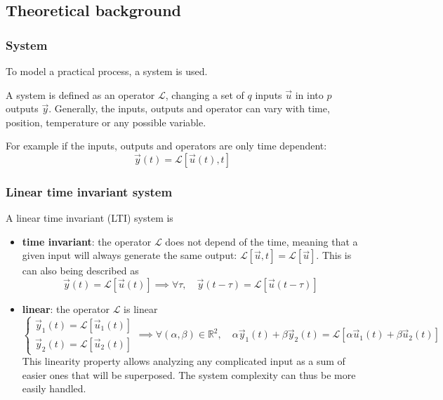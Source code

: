 \subsection{Theoretical background}
\subsubsection{System}
To model a practical process, a system is used. 

A system is defined as an operator $\mathcal{L}$, changing a set of $q$ inputs $\vec{u}$ in into $p$ outputs $\vec{y}$. Generally, the inputs, outputs and operator can vary with time, position, temperature or any possible variable.

For example if the inputs, outputs and operators are only time dependent:
\begin{equation}
	\vec{y}(t) = \mathcal{L}[\vec{u}(t),t]
\end{equation}

\subsubsection{Linear time invariant system}
A linear time invariant (LTI) system is 
\begin{itemize}
	\item \textbf{time invariant}: the operator $\mathcal{L}$ does not depend of the time, meaning that a given input will always generate the same output: $\mathcal{L}[\vec{u},t]=\mathcal{L}[\vec{u}]$. This is can also being described as
	\begin{equation}
		\vec{y}(t) = \mathcal{L}[\vec{u}(t)] \implies \forall \tau, \quad \vec{y}(t-\tau) = \mathcal{L}[\vec{u}(t-\tau)]
	\end{equation}
	\item \textbf{linear}: 	the operator  $\mathcal{L}$ is linear
	\begin{equation}
		\begin{cases}
			\vec{y}_1(t) = \mathcal{L}[\vec{u}_1(t)] \\
			\vec{y}_2(t) = \mathcal{L}[\vec{u}_2(t)] 
		\end{cases}
		\implies \forall (\alpha, \beta) \in \mathbb{R}^2, \quad
		\alpha \vec{y}_1(t) + \beta \vec{y}_2(t) = \mathcal{L}[\alpha\vec{u}_1(t)+\beta\vec{u}_2(t)]
	\end{equation}
	This linearity property allows analyzing any complicated input as a sum of easier ones that will be superposed. The system complexity can thus be more easily handled.
\end{itemize}

